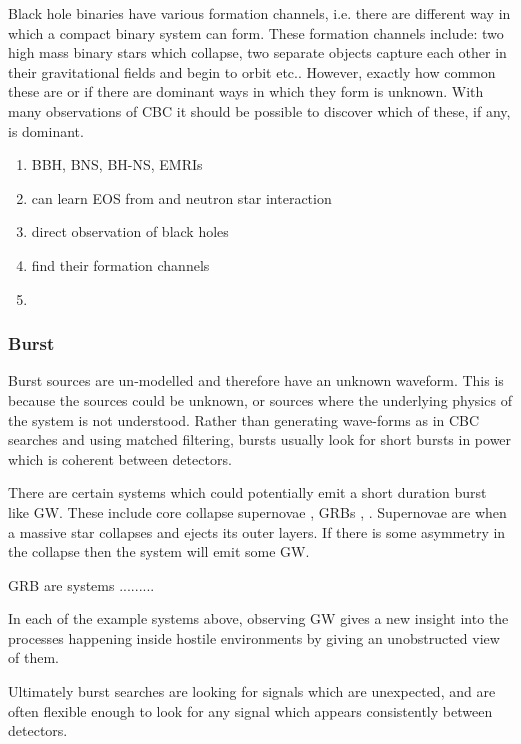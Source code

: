 Black hole binaries have various formation channels, i.e. there are different way in which a compact binary system can form. 
These formation channels include: two high mass binary stars which collapse, two separate objects capture each other in their gravitational fields and begin to orbit etc..
However, exactly how common these are or if there are dominant ways in which they form is unknown. 
With many observations of \ac{CBC} it should be possible to discover which of these, if any, is dominant.

\begin{enumerate}
    \item BBH, BNS, BH-NS, EMRIs 
    \item can learn EOS from and neutron star interaction
    \item direct observation of black holes
    \item find their formation channels
    \item 
\end{enumerate}


\subsubsection{\label{sources:transient:burst}Burst}

Burst sources are un-modelled and therefore have an unknown waveform.
This is because the sources could be unknown, or sources where the underlying physics of the system is not understood. 
Rather than generating wave-forms as in \ac{CBC} searches and using matched filtering, bursts usually look for short bursts in power which is coherent between detectors.

There are certain systems which could potentially emit a short duration burst like \ac{GW}.
These include core collapse supernovae \cite{}, \acp{GRB} \cite{}, .
Supernovae are when a massive star collapses and ejects its outer layers. 
If there is some asymmetry in the collapse then the system will emit some \ac{GW}.

\ac{GRB} are systems .........

In each of the example systems above, observing \ac{GW} gives a new insight into the processes happening inside hostile environments by giving an unobstructed view of them.

Ultimately burst searches are looking for signals which are unexpected, and are often flexible enough to look for any signal which appears consistently between detectors.

